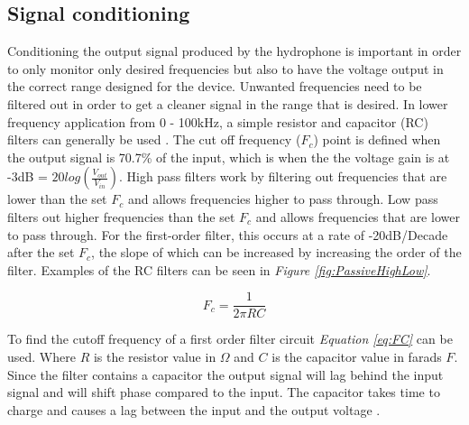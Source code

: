 
\subsection{Signal conditioning}

Conditioning the output signal produced by the hydrophone is important in order to only monitor only desired frequencies but also to have the voltage output in the correct range designed for the device.
Unwanted frequencies need to be filtered out in order to get a cleaner signal in the range that is desired.
In lower frequency application from 0 - 100kHz, a simple resistor and capacitor (RC) filters can generally be used \cite{noauthor_low_2013}.
The cut off frequency ($F_c$) point is defined when the output signal is 70.7\% of the input, which is when the the voltage gain is at -3dB = $20log(\frac{V_{out}}{V_{in}})$.
High pass filters work by filtering out frequencies that are lower than the set $F_c$ and allows frequencies higher to pass through.
Low pass filters out higher frequencies than the set $F_c$ and allows frequencies that are lower to pass through. 
For the first-order filter, this occurs at a rate of -20dB/Decade after the set $F_c$, the slope of which can be increased by increasing the order of the filter.
Examples of the RC filters can be seen in \textit{Figure \ref{fig:PassiveHighLow}}.


\begin{equation}
    F_c = \frac{1}{2\pi RC}
    \label{eq:FC}
\end{equation}

To find the cutoff frequency of a first order filter circuit \textit{Equation \ref{eq:FC}} can be used.
Where $R$ is the resistor value in $\Omega$ and $C$ is the capacitor value in farads $F$.
Since the filter contains a capacitor the output signal will lag behind the input signal and will shift phase compared to the input. 
The capacitor takes time to charge and causes a lag between the input and the output voltage \cite{noauthor_low_2013}. 

